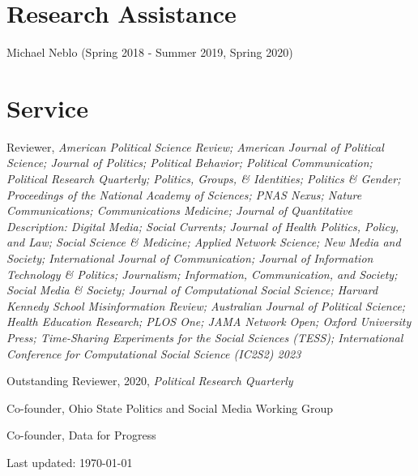 \documentclass[letterpaper]{article}
\renewenvironment{itemize}{
  \begin{list}{}{
    \setlength{\leftmargin}{1.5em}
  }
}{
  \end{list}
}
\begin{document}
\section*{Research Assistance}
\begin{itemize}
\item  Michael Neblo (Spring 2018 - Summer 2019, Spring 2020)
\end{itemize}

\section*{Service}

\begin{itemize}
\item Reviewer, \textit{American Political Science Review; American Journal of Political Science; Journal of Politics; Political Behavior; Political Communication; Political Research Quarterly; Politics, Groups, \& Identities; Politics \& Gender; Proceedings of the National Academy of Sciences; PNAS Nexus; Nature Communications; Communications Medicine; Journal of Quantitative Description: Digital Media; Social Currents; Journal of Health Politics, Policy, and Law; Social Science \& Medicine; Applied Network Science; New Media and Society; International Journal of Communication; Journal of Information Technology \& Politics; Journalism; Information, Communication, and Society; Social Media \& Society; Journal of Computational Social Science; Harvard Kennedy School Misinformation Review; Australian Journal of Political Science; Health Education Research; PLOS One; JAMA Network Open; Oxford University Press; Time-Sharing Experiments for the Social Sciences (TESS); International Conference for Computational Social Science (IC2S2) 2023}
\begin{itemize}
Outstanding Reviewer, 2020, \textit{Political Research Quarterly}
\end{itemize}
\item Co-founder, Ohio State Politics and Social Media Working Group
\item Co-founder, Data for Progress
\end{itemize}

\begin{center}
  \begin{footnotesize}
    Last updated: \today
      \end{footnotesize}
\end{center}
\end{document}
